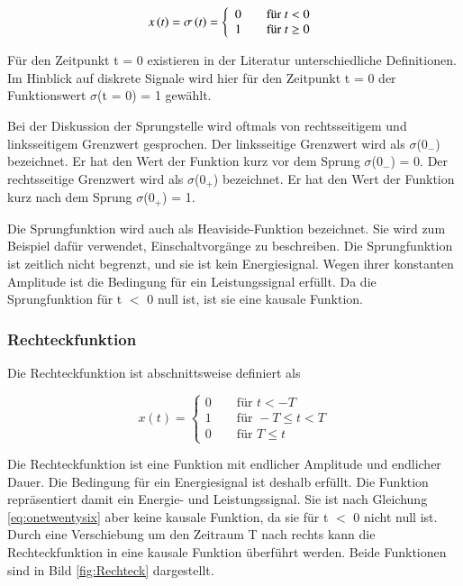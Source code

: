 \begin{equation}\label{eq:onetwentyfive}
x\left(t\right)=\sigma \left(t\right)=\left\{\begin{array}{l} 
{0\qquad \text{für } t<0} \\ 
{1\qquad \text{für } t \ge 0} 
\end{array}\right.\\
\end{equation}


\noindent F\"{u}r den Zeitpunkt t = 0 existieren in der Literatur unterschiedliche Definitionen. Im Hinblick auf diskrete Signale wird hier f\"{u}r den Zeitpunkt t = 0 der Funktionswert $\sigma$(t = 0) = 1 gew\"{a}hlt. 

\noindent Bei der Diskussion der Sprungstelle wird oftmals von rechtsseitigem und linksseitigem Grenzwert gesprochen. Der linksseitige Grenzwert wird als $\sigma$(0${}_{-}$) bezeichnet. Er hat den Wert der Funktion kurz vor dem Sprung $\sigma$(0${}_{-}$) = 0. Der rechtsseitige Grenzwert wird als $\sigma$(0${}_{+}$) bezeichnet. Er hat den Wert der Funktion kurz nach dem Sprung $\sigma$(0${}_{+}$) = 1. 

\noindent Die Sprungfunktion wird auch als Heaviside-Funktion bezeichnet. Sie wird zum Beispiel daf\"{u}r verwendet, Einschaltvorg\"{a}nge zu beschreiben. Die Sprungfunktion ist zeitlich nicht begrenzt, und sie ist kein Energiesignal. Wegen ihrer konstanten Amplitude ist die Bedingung f\"{u}r ein Leistungssignal erf\"{u}llt. Da die Sprungfunktion f\"{u}r t $\mathrm{<}$ 0 null ist, ist sie eine kausale Funktion.


\subsubsection{ Rechteckfunktion}

\noindent Die Rechteckfunktion ist abschnittsweise definiert als 

\begin{equation}\label{eq:onetwentysix}
x\left(t\right)=\left\{\begin{array}{l} 
{0\qquad \text{für }t<-T} \\ 
{1\qquad \text{für }-T{\le t<T}} \\ 
{0\qquad \text{für }T \le t} 
\end{array}\right.
\end{equation}


\noindent Die Rechteckfunktion ist eine Funktion mit endlicher Amplitude und endlicher Dauer. Die Bedingung f\"{u}r ein Energiesignal ist deshalb erf\"{u}llt. Die Funktion repr\"{a}sentiert damit ein Energie- und Leistungssignal. Sie ist nach Gleichung \ref{eq:onetwentysix} aber keine kausale Funktion, da sie f\"{u}r t $\mathrm{<}$ 0 nicht null ist. Durch eine Verschiebung um den Zeitraum T nach rechts kann die Rechteckfunktion in eine kausale Funktion \"{u}berf\"{u}hrt werden. Beide Funktionen sind in Bild \ref{fig:Rechteck} dargestellt.

